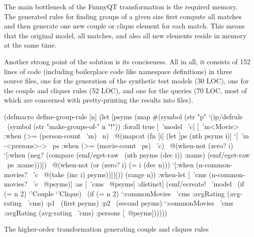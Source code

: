 \documentclass[submission]{eptcs}
\begin{document}
The main bottleneck of the FunnyQT transformation is the required memory.  The
generated rules for finding groups of a given size first compute all matches
and then generate one new couple or clique element for each match.  This means
that the original model, all matches, and also all new elements reside in
memory at the same time.

Another strong point of the solution is its conciseness.  All in all, it
consists of 152 lines of code (including boilerplace code like namespace
definitions) in three source files, one for the generation of the synthetic
test models (30 LOC), one for the couple and cliques rules (52 LOC), and one
for the queries (70 LOC, most of which are concerned with pretty-printing the
results into files).

\appendix

\begin{listing}
\begin{clojurecode}
(defmacro define-group-rule [n]
  (let [psyms (map #(symbol (str "p" %
    `(ip/defrule ~(symbol (str "make-groups-of-" n "!"))
       {:forall true}
       [~'model ~'c]
       [~'m<Movie> :when (>= (person-count ~'m) ~n)
        ~@(mapcat (fn [i]
                    (let [ps (nth psyms i)]
                      `[~'m -<persons>-> ~ps
                        :when (>= (movie-count ~ps) ~'c)
                        ~@(when-not (zero? i)
                            `[:when (neg? (compare (emf/eget-raw ~(nth psyms (dec i)) :name)
                                                   (emf/eget-raw ~ps :name)))])
                        ~@(when-not (or (zero? i) (= i (dec n)))
                            `[:when (n-common-movies? ~'c ~@(take (inc i) psyms))])]))
                  (range n))
        :when-let [~'cms (n-common-movies? ~'c ~@psyms)]
        :as [~'cms ~@psyms]
        :distinct]
       (emf/ecreate! ~'model ~(if (= n 2) `'Couple `'Clique)
                     ~(if (= n 2)
                        `{:commonMovies ~'cms :avgRating (avg-rating ~'cms)
                          :p1 ~(first psyms) :p2 ~(second psyms)}
                        `{:commonMovies ~'cms :avgRating (avg-rating ~'cms)
                          :persons [~@psyms]})))))
\end{clojurecode}
\caption{The higher-order transformation generating couple and cliques rules}
\label{lst:rule-gen-macro}
\end{listing}




\end{document}
